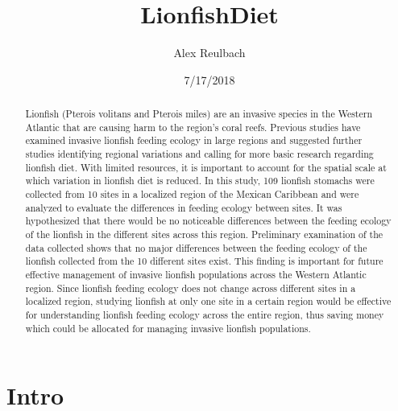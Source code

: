 \documentclass[]{article}
\title{LionfishDiet}
\author{Alex Reulbach}
\date{7/17/2018}
\begin{document}
\maketitle
\begin{abstract}
Lionfish (Pterois volitans and Pterois miles) are an invasive species in
the Western Atlantic that are causing harm to the region's coral reefs.
Previous studies have examined invasive lionfish feeding ecology in
large regions and suggested further studies identifying regional
variations and calling for more basic research regarding lionfish diet.
With limited resources, it is important to account for the spatial scale
at which variation in lionfish diet is reduced. In this study, 109
lionfish stomachs were collected from 10 sites in a localized region of
the Mexican Caribbean and were analyzed to evaluate the differences in
feeding ecology between sites. It was hypothesized that there would be
no noticeable differences between the feeding ecology of the lionfish in
the different sites across this region. Preliminary examination of the
data collected shows that no major differences between the feeding
ecology of the lionfish collected from the 10 different sites exist.
This finding is important for future effective management of invasive
lionfish populations across the Western Atlantic region. Since lionfish
feeding ecology does not change across different sites in a localized
region, studying lionfish at only one site in a certain region would be
effective for understanding lionfish feeding ecology across the entire
region, thus saving money which could be allocated for managing invasive
lionfish populations.
\end{abstract}

\section{Intro}\label{intro}
\end{document}
